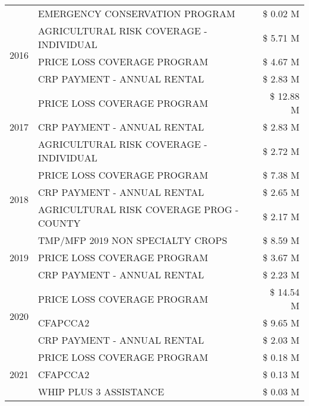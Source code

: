 \begin{tabular}{llr}
 & EMERGENCY CONSERVATION PROGRAM & \$ 0.02 M \\
\cline{1-3}
\multirow[t]{3}{*}{2016} & AGRICULTURAL RISK COVERAGE - INDIVIDUAL & \$ 5.71 M \\
 & PRICE LOSS COVERAGE PROGRAM & \$ 4.67 M \\
 & CRP PAYMENT - ANNUAL RENTAL & \$ 2.83 M \\
\cline{1-3}
\multirow[t]{3}{*}{2017} & PRICE LOSS COVERAGE PROGRAM & \$ 12.88 M \\
 & CRP PAYMENT - ANNUAL RENTAL & \$ 2.83 M \\
 & AGRICULTURAL RISK COVERAGE - INDIVIDUAL & \$ 2.72 M \\
\cline{1-3}
\multirow[t]{3}{*}{2018} & PRICE LOSS COVERAGE PROGRAM & \$ 7.38 M \\
 & CRP PAYMENT - ANNUAL RENTAL & \$ 2.65 M \\
 & AGRICULTURAL RISK COVERAGE PROG - COUNTY & \$ 2.17 M \\
\cline{1-3}
\multirow[t]{3}{*}{2019} & TMP/MFP 2019 NON SPECIALTY CROPS & \$ 8.59 M \\
 & PRICE LOSS COVERAGE PROGRAM & \$ 3.67 M \\
 & CRP PAYMENT - ANNUAL RENTAL & \$ 2.23 M \\
\cline{1-3}
\multirow[t]{3}{*}{2020} & PRICE LOSS COVERAGE PROGRAM & \$ 14.54 M \\
 & CFAPCCA2 & \$ 9.65 M \\
 & CRP PAYMENT - ANNUAL RENTAL & \$ 2.03 M \\
\cline{1-3}
\multirow[t]{3}{*}{2021} & PRICE LOSS COVERAGE PROGRAM & \$ 0.18 M \\
 & CFAPCCA2 & \$ 0.13 M \\
 & WHIP PLUS 3 ASSISTANCE & \$ 0.03 M \\
\cline{1-3}
\bottomrule
\end{tabular}

